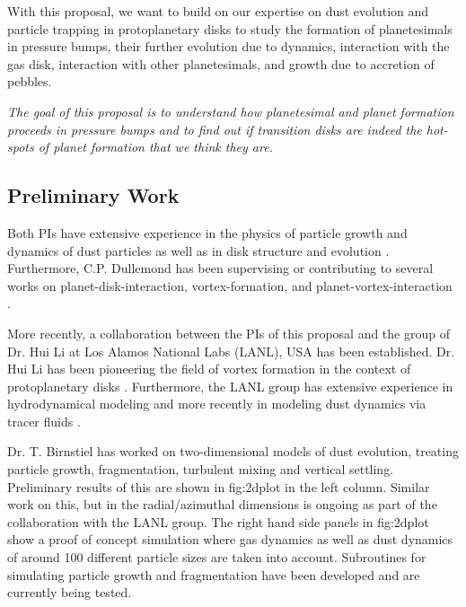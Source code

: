 \documentclass[10pt,fleqn,twoside]{article}
\newenvironment{highlight}{\color{blue}\itshape}{\ignorespacesafterend}
\newcommand{\cref}[1]{#1}
\begin{document}
With this proposal, we want to build on our expertise on dust
evolution and particle trapping in protoplanetary disks to study the
formation of planetesimals in pressure bumps, their further
evolution due to dynamics, interaction with the gas disk,
interaction with other planetesimals, and growth due to accretion of
pebbles.

\begin{highlight}
The goal of this proposal is to understand how planetesimal
and planet formation proceeds in pressure bumps and to find out
if transition disks are indeed the hot-spots of planet formation that
we think they are.
\end{highlight}

\subsection*{Preliminary Work}

Both PIs have extensive experience in the physics of particle growth
and dynamics of dust particles \citep[e..g][see
\citealp{2016SSRv..tmp...32B} for a recent
review]{2005A&A...434..971D, 2008A&A...480..859B, 2008A&A...489..931Z,
2010A&A...513A..79B, 2012A&A...539A.148B, 2014A&A...572A..78D} as well
as in disk structure and evolution \citep[e.g.][and many
others]{2001ApJ...560..957D, 2002A&A...389..464D, 2004A&A...417..159D,
2010ARA&A..48..205D,2015ApJ...813L..14B}. Furthermore, C.P. Dullemond
has been supervising or contributing to several works on
planet-disk-interaction, vortex-formation, and
planet-vortex-interaction
\citep{2012MNRAS.419.1701R,2013A&A...553L...3A,2014A&A...572A..61A}.

More recently, a collaboration between the PIs of this proposal and
the group of Dr. Hui Li at Los Alamos National Labs (LANL), USA has
been established. Dr. Hui Li has been pioneering the field of
vortex formation in the context of protoplanetary disks
\citep{2001ApJ...551..874L,2000ApJ...533.1023L}. Furthermore, the LANL
group has extensive experience in hydrodynamical modeling and more
recently in modeling dust dynamics via tracer fluids
\citep[e.g.,][]{2014ApJ...795L..39F,2016ApJ...818...76J}.

Dr. T. Birnstiel has worked on two-dimensional models of dust
evolution, treating particle growth, fragmentation, turbulent mixing
and vertical settling. Preliminary results of this are shown in
\cref{fig:2dplot} in the left column. Similar work on this, but in the
radial/azimuthal dimensions is ongoing as part of the collaboration
with the LANL group. The right hand side panels in \cref{fig:2dplot}
show a proof of concept simulation where gas dynamics as well as dust
dynamics of around 100 different particle sizes are taken into
account. Subroutines for simulating particle growth and fragmentation
have been developed and are currently being tested.
\end{document}
